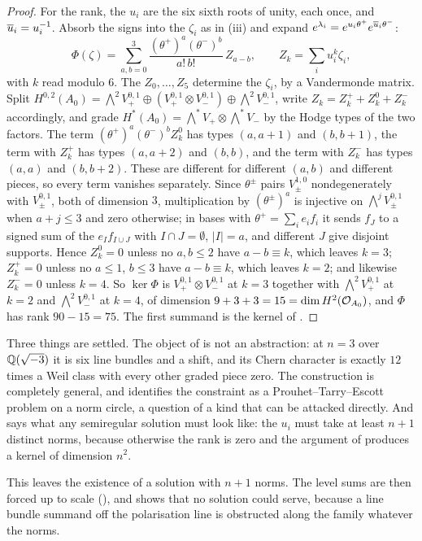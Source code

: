 \begin{proof}
For the rank, the $u_{i}$ are the six sixth roots of unity, each once, and
$\overline{u}_{i}=u_{i}^{-1}$. Absorb the signs into the $\zeta_{i}$ as in
(iii) and expand
$e^{\lambda_{i}}=e^{u_{i}\theta^{+}}e^{\overline{u}_{i}\theta^{-}}$:
\[
  \Phi(\zeta)=\sum_{a,b=0}^{3}\frac{(\theta^{+})^{a}(\theta^{-})^{b}}{a!\,b!}\,Z_{a-b},
  \qquad Z_{k}=\sum_{i}u_{i}^{k}\zeta_{i},
\]
with $k$ read modulo $6$. The $Z_{0},\dots,Z_{5}$ determine the $\zeta_{i}$,
by a Vandermonde matrix. Split
$H^{0,2}(A_{0})=\bigwedge^{2}V_{+}^{0,1}\oplus(V_{+}^{0,1}\otimes V_{-}^{0,1})
\oplus\bigwedge^{2}V_{-}^{0,1}$, write $Z_{k}=Z_{k}^{+}+Z_{k}^{0}+Z_{k}^{-}$
accordingly, and grade $H^{*}(A_{0})=\bigwedge^{*}V_{+}\otimes\bigwedge^{*}V_{-}$
by the Hodge types of the two factors. The term
$(\theta^{+})^{a}(\theta^{-})^{b}Z_{k}^{0}$ has types $(a,a+1)$ and $(b,b+1)$,
the term with $Z_{k}^{+}$ has types $(a,a+2)$ and $(b,b)$, and the term with
$Z_{k}^{-}$ has types $(a,a)$ and $(b,b+2)$. These are different for
different $(a,b)$ and different pieces, so every term vanishes separately.
Since $\theta^{\pm}$ pairs $V_{\pm}^{1,0}$ nondegenerately with $V_{\pm}^{0,1}$,
both of dimension $3$, multiplication by $(\theta^{\pm})^{a}$ is injective on
$\bigwedge^{j}V_{\pm}^{0,1}$ when $a+j\le3$ and zero otherwise; in bases
with $\theta^{+}=\sum_{i}e_{i}f_{i}$ it sends $f_{J}$ to a signed sum of the
$e_{I}f_{I\cup J}$ with $I\cap J=\emptyset$, $|I|=a$, and different $J$ give
disjoint supports. Hence $Z_{k}^{0}=0$ unless no $a,b\le2$ have $a-b\equiv k$,
which leaves $k=3$; $Z_{k}^{+}=0$ unless no $a\le1$, $b\le3$ have
$a-b\equiv k$, which leaves $k=2$; and likewise $Z_{k}^{-}=0$ unless $k=4$. So
$\ker\Phi$ is $V_{+}^{0,1}\otimes V_{-}^{0,1}$ at $k=3$ together with
$\bigwedge^{2}V_{+}^{0,1}$ at $k=2$ and $\bigwedge^{2}V_{-}^{0,1}$ at $k=4$, of
dimension $9+3+3=15=\dim H^{2}(\mathcal{O}_{A_{0}})$, and $\Phi$ has rank
$90-15=75$. The first summand is the kernel of .
\end{proof}

\begin{remark}\label{rem:pteoutcome}
Three things are settled. The object of  is not an
abstraction: at $n=3$ over $\mathbb{Q}(\sqrt{-3})$ it is six line bundles and a
shift, and its Chern character is exactly $12$ times a Weil class with every
other graded piece zero. The construction is completely general, and
 identifies the constraint as a Prouhet--Tarry--Escott problem
on a norm circle, a question of a kind that can be attacked directly. And
 says what any semiregular solution must look like: the
$u_{i}$ must take at least $n+1$ distinct norms, because otherwise the rank is
zero and the argument of  produces a kernel of
dimension $n^{2}$.

This leaves the existence of a solution with $n+1$ norms. The level sums are
then forced up to scale (), and  shows
that no solution could serve, because a line bundle summand off the
polarisation line is obstructed along the family whatever the norms.
\end{remark}

